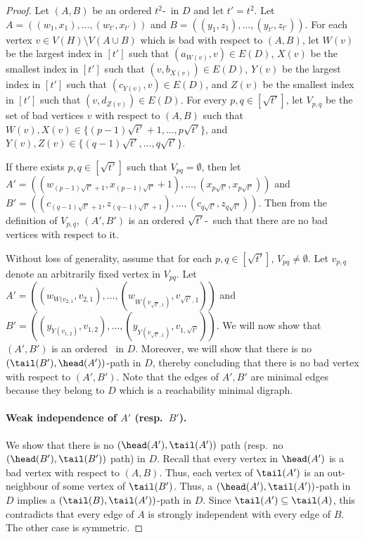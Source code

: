 \begin{proof}
Let $(A,B)$ be an ordered $t^2$-\toughpair\ in $D$ and
let $t'=t^2$.
Let $A=((w_1,x_1), \ldots, (w_{t'},x_{t'}))$ and $B=((y_1,z_1), \ldots, (y_{t'},z_{t'}))$.
For each vertex $v \in V(H) \setminus V(A \cup B)$ which is bad with respect to $(A,B)$, let $W(v)$ be the largest index in $[t']$ such that $(a_{W(v)},v) \in E(D)$, $X(v)$ be the smallest index in $[t']$ such that $(v,b_{X(v)}) \in E(D)$, $Y(v)$ be the largest index in $[t']$ such that $(c_{Y(v)},v) \in E(D)$, and $Z(v)$ be the smallest index in $[t']$ such that $(v,d_{Z(v)}) \in E(D)$.
For every $p,q \in [\sqrt{t'}]$, let $V_{p,q}$ be the set of bad vertices $v$ with respect to $(A,B)$ such that
$W(v),X(v) \in \{(p-1)\sqrt{t'}+1, \ldots, p\sqrt{t'}\}$, and $Y(v),Z(v) \in \{(q-1)\sqrt{t'}, \ldots, q\sqrt{t'}\}$.

If there exists $p,q \in [\sqrt{t'}]$ such that $V_{pq}=\emptyset$, then let $A'=((w_{(p-1)\sqrt{t'}+1},x_{(p-1)\sqrt{t'}}+1), \ldots, (x_{p\sqrt{t'}}, x_{p\sqrt{t'}}))$ and 
$B'=((c_{(q-1)\sqrt{t'}+1},z_{(q-1)\sqrt{t'}+1}),\ldots, (c_{q\sqrt{t'}},z_{q\sqrt{t'}}))$. Then from the definition of $V_{p,q}$, $(A',B')$ is an ordered $\sqrt{t'}$-\toughpair\ such that there are no bad vertices with respect to it.

Without loss of generality, assume that for each $p,q \in [\sqrt{t'}]$, $V_{pq}\neq \emptyset$. Let $v_{p,q}$ denote an arbitrarily fixed vertex in $V_{pq}$. 
Let $A'=((w_{W(v_{2,1}}, v_{2,1}), \ldots, (w_{W(v_{\sqrt{t'},1})}, v_{\sqrt{t'},1}))$ and
 $B'=((y_{Y(v_{1,2})}, v_{1,2}),\ldots, (y_{Y(v_{\sqrt{t'},1})},v_{1,\sqrt{t'}} ))$. We will now show that $(A',B')$ is an ordered \toughpair\ in $D$. Moreover, we will show that there is no $(\tail(B'),\head(A'))$-path in $D$, thereby concluding that there is no bad vertex with respect to $(A',B')$. Note that the edges of $A',B'$ are minimal edges because they belong to $D$ which is a reachability minimal digraph.

\paragraph*{Weak independence of $A'$ (resp.~$B'$).}  We show that  there is no $(\head(A'),\tail(A'))$ path (resp.~no $(\head(B'),\tail(B'))$ path) in $D$. Recall that every vertex in $\head(A')$ is a bad vertex with respect to $(A,B)$.
Thus, each vertex of $\tail(A')$ is an out-neighbour of some vertex of $\tail(B')$. 
Thus, a $(\head(A'),\tail(A'))$-path in $D$ implies a $(\tail(B),\tail(A'))$-path in $D$. Since $\tail(A') \subseteq \tail(A)$, this contradicts that every edge of $A$ is strongly independent with every edge of $B$. 
The other case is symmetric.


\end{proof}
